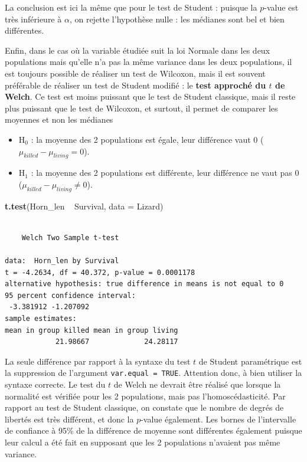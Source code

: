\documentclass[a4paperpaper,]{article}
\newenvironment{Shaded}{\begin{snugshade}}{\end{snugshade}}
\newcommand{\DataTypeTok}[1]{\textcolor[rgb]{0.00,0.34,0.68}{#1}}
\newcommand{\KeywordTok}[1]{\textcolor[rgb]{0.12,0.11,0.11}{\textbf{#1}}}
\newcommand{\NormalTok}[1]{\textcolor[rgb]{0.12,0.11,0.11}{#1}}
\newcommand{\OperatorTok}[1]{\textcolor[rgb]{0.12,0.11,0.11}{#1}}
\newcommand{\StringTok}[1]{\textcolor[rgb]{0.75,0.01,0.01}{#1}}
\providecommand{\tightlist}{%
  \setlength{\itemsep}{0pt}\setlength{\parskip}{0pt}}
\begin{document}
La conclusion est ici la même que pour le test de Student : puisque la \(p\)-value est très inférieure à \(\alpha\), on rejette l'hypothèse nulle : les médianes sont bel et bien différentes.

Enfin, dans le cas où la variable étudiée suit la loi Normale dans les deux populations mais qu'elle n'a pas la même variance dans les deux populations, il est toujours possible de réaliser un test de Wilcoxon, mais il est souvent préférable de réaliser un test de Student modifié : le \textbf{test approché du \(t\) de Welch}. Ce test est moins puissant que le test de Student classique, mais il reste plus puissant que le test de Wilcoxon, et surtout, il permet de comparer les moyennes et non les médianes

\begin{itemize}
\tightlist
\item
  H\(_0\) : la moyenne des 2 populations est égale, leur différence vaut 0 (\(\mu_{killed}-\mu_{living} = 0\)).
\item
  H\(_1\) : la moyenne des 2 populations est différente, leur différence ne vaut pas 0 (\(\mu_{killed}-\mu_{living} \neq 0\)).
\end{itemize}

\begin{Shaded}
\begin{Highlighting}[]
\KeywordTok{t.test}\NormalTok{(Horn_len }\OperatorTok{~}\StringTok{ }\NormalTok{Survival, }\DataTypeTok{data =}\NormalTok{ Lizard)}
\end{Highlighting}
\end{Shaded}

\begin{verbatim}

    Welch Two Sample t-test

data:  Horn_len by Survival
t = -4.2634, df = 40.372, p-value = 0.0001178
alternative hypothesis: true difference in means is not equal to 0
95 percent confidence interval:
 -3.381912 -1.207092
sample estimates:
mean in group killed mean in group living 
            21.98667             24.28117 
\end{verbatim}

La seule différence par rapport à la syntaxe du test \(t\) de Student paramétrique est la suppression de l'argument \texttt{var.equal\ =\ TRUE}. Attention donc, à bien utiliser la syntaxe correcte. Le test du \(t\) de Welch ne devrait être réalisé que lorsque la normalité est vérifiée pour les 2 populations, mais pas l'homoscédasticité. Par rapport au test de Student classique, on constate que le nombre de degrés de libertés est très différent, et donc la \(p\)-value également. Les bornes de l'intervalle de confiance à 95\% de la différence de moyenne sont différentes également puisque leur calcul a été fait en supposant que les 2 populations n'avaient pas même variance.
\end{document}
